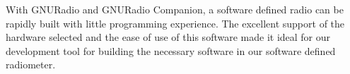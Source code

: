 With GNURadio and GNURadio Companion, a software defined radio can be rapidly built with little programming experience.  The excellent support of the hardware selected and the ease of use of this software made it ideal for our development tool for building the necessary software in our software defined radiometer.







